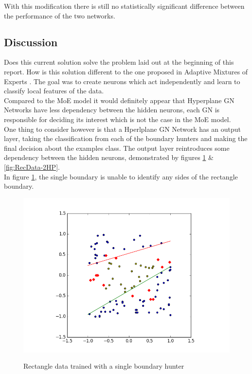 \documentclass[notitlepage]{report}
\theoremstyle{definition}
\begin{document}
With this modification there is still no statistically significant difference between the performance of the two networks.

\subsection{Discussion}
Does this current solution solve the problem laid out at the beginning of this report. How is this solution different to the one proposed in Adaptive Mixtures of Experts \cite{jacobs1991adaptive}. The goal was to create neurons which act independently and learn to classify local features of the data.\\

Compared to the MoE model it would definitely appear that Hyperplane GN Networks have less dependency between the hidden neurons, each GN is responsible for deciding its interest which is not the case in the MoE model.\\

One thing to consider however is that a Hperlplane GN Network has an output layer, taking the classification from each of the boundary hunters and making the final decision about the examples class. The output layer reintroduces some dependency between the hidden neurons, demonstrated by figures \ref{fig:RecData-1HP} \& \ref{fig:RecData-2HP}.\\

In figure \ref{fig:RecData-1HP}, the single boundary is unable to identify any sides of the rectangle boundary.

\begin{figure}[H]
  \centering
  \begin{minipage}[b]{0.8\textwidth}
    \includegraphics[width=\textwidth]{RecData-1HP.png}
    \caption{}
    \label{fig:RecData-1HP}
  \end{minipage}
  \hfill

Rectangle data trained with a single boundary hunter
\end{figure}
\end{document}
